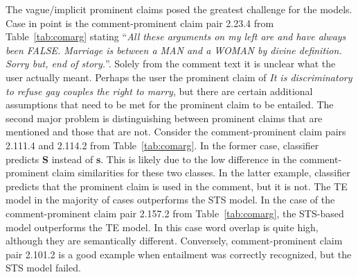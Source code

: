 The vague/implicit prominent claims posed the greatest challenge for the models. 
Case in point is the comment-prominent claim pair 2.23.4 from Table~\ref{tab:comarg}  stating 
``\textit{All these arguments on my left are and have always been FALSE. Marriage is
between a MAN and a WOMAN by divine definition. Sorry but, end of story.}''.
Solely from the comment text it is unclear what the user actually meant. 
Perhaps the user  the prominent claim of 
\textit{ It is discriminatory to refuse gay couples the right to marry},
but there are certain additional assumptions that need to be met for the prominent claim 
to be entailed. 
The second major problem is distinguishing between prominent claims that are mentioned 
and those that are not. 
Consider the comment-prominent claim pairs 2.111.4 and 2.114.2 from Table~\ref{tab:comarg}. 
In the former case, classifier predicts \textbf{S} instead of \textbf{s}. 
This is likely due to the low difference in the comment-prominent claim similarities for these
two classes. 
In the latter example, classifier predicts that the prominent claim is used in the comment, but
it is not. 
The TE model in the majority of cases outperforms the STS model. 
In the case of the comment-prominent claim pair 2.157.2 from Table~\ref{tab:comarg}, the STS-based
model outperforms the TE model. 
In this case word overlap is quite high, although they are semantically different. 
Conversely, comment-prominent claim pair 2.101.2 is a good example when
entailment was correctly recognized, 
but the STS model failed. 


% 
